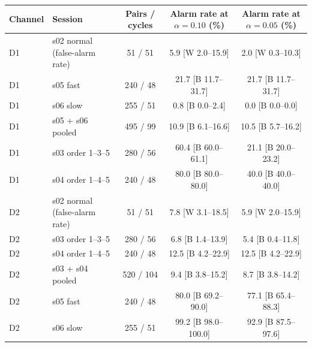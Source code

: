 \begin{tabular}{@{}llccc@{}}
\toprule
Channel & Session & Pairs / cycles & Alarm rate at $\alpha=0.10$ (\%) & Alarm rate at $\alpha=0.05$ (\%) \\
\midrule
D1 & s02 normal (false-alarm rate) & 51 / 51 & 5.9 [W 2.0--15.9] & 2.0 [W 0.3--10.3] \\ %
D1 & s05 fast & 240 / 48 & 21.7 [B 11.7--31.7] & 21.7 [B 11.7--31.7] \\ %
D1 & s06 slow & 255 / 51 & 0.8 [B 0.0--2.4] & 0.0 [B 0.0--0.0] \\ %
D1 & s05 + s06 pooled & 495 / 99 & 10.9 [B 6.1--16.6] & 10.5 [B 5.7--16.2] \\ %
D1 & s03 order 1--3--5 & 280 / 56 & 60.4 [B 60.0--61.1] & 21.1 [B 20.0--23.2] \\ %
D1 & s04 order 1--4--5 & 240 / 48 & 80.0 [B 80.0--80.0] & 40.0 [B 40.0--40.0] \\ %
\midrule
D2 & s02 normal (false-alarm rate) & 51 / 51 & 7.8 [W 3.1--18.5] & 5.9 [W 2.0--15.9] \\ %
D2 & s03 order 1--3--5 & 280 / 56 & 6.8 [B 1.4--13.9] & 5.4 [B 0.4--11.8] \\ %
D2 & s04 order 1--4--5 & 240 / 48 & 12.5 [B 4.2--22.9] & 12.5 [B 4.2--22.9] \\ %
D2 & s03 + s04 pooled & 520 / 104 & 9.4 [B 3.8--15.2] & 8.7 [B 3.8--14.2] \\ %
D2 & s05 fast & 240 / 48 & 80.0 [B 69.2--90.0] & 77.1 [B 65.4--88.3] \\ %
D2 & s06 slow & 255 / 51 & 99.2 [B 98.0--100.0] & 92.9 [B 87.5--97.6] \\ %
\bottomrule
\end{tabular}
